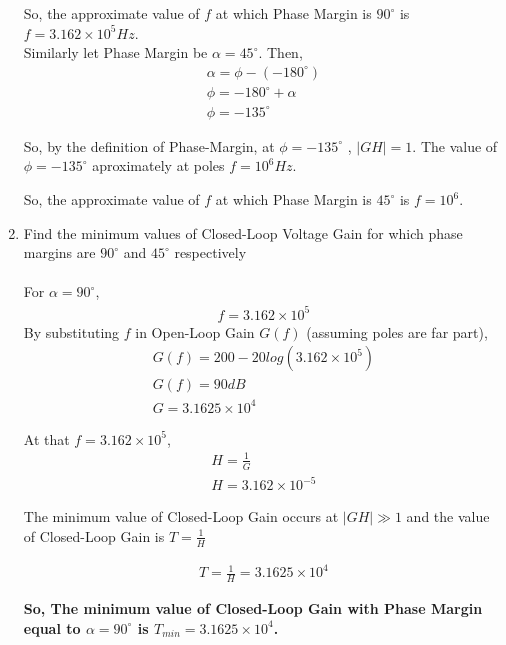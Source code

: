\begin{enumerate}[label=\thesubsection.\arabic*.,ref=\thesubsection.\theenumi]
So, the approximate value of $f$ at which Phase Margin is $90^{\circ}$ is $f=3.162 \times 10^{5} Hz$.\\

Similarly let Phase Margin be $\alpha = 45^{\circ}$. Then,
\begin{align}
\alpha = \phi - (-180^{\circ})\\
\phi = -180^{\circ} + \alpha\\
\phi = -135^{\circ}
\end{align}

So, by the definition of Phase-Margin, at $\phi = -135^{\circ}$ , $|GH| = 1 $.  The value of $\phi = -135^{\circ}$ aproximately at poles $f=10^{6} Hz$. 

So, the approximate value of $f$ at which Phase Margin is $45^{\circ}$ is $f=10^{6}$.\\
\item Find the minimum values of Closed-Loop Voltage Gain for which phase margins are $90^{\circ}$ and  $45^{\circ}$ respectively\\
\solution\\
For $\alpha=90^{\circ}$,
\begin{align}
f=3.162 \times 10^{5}
\end{align}
By substituting $f$ in Open-Loop Gain $G(f)$ (assuming poles are far part), 
\begin{align}
G(f) = 200 - 20log(3.162 \times 10^{5})\\
G(f) = 90 dB \\
G = 3.1625 \times 10^{4}
\end{align}

At that $f=3.162 \times 10^{5}$, 
\begin{align}
H = \frac{1}{G}\\
H = 3.162 \times 10^{-5}
\end{align}

The minimum value of Closed-Loop Gain occurs at $|GH| \gg 1$ and the value of Closed-Loop Gain is $T=\frac{1}{H}$

\begin{align}
T = \frac{1}{H} = 3.1625 \times 10^{4}
\end{align}

\textbf{So, The minimum value of Closed-Loop Gain with Phase Margin equal to $\alpha=90^{\circ}$ is $T_{min} = 3.1625 \times 10^{4}$.}\\


\end{enumerate}
